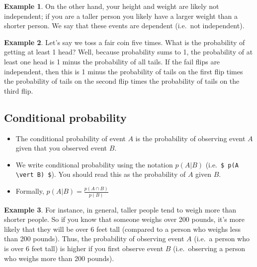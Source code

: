 \documentclass[]{article}
\theoremstyle{definition}
\newtheorem{exmp}{Example}[section]
\begin{document}
\begin{exmp}
On the other hand, your height and weight are likely not independent; if you are a taller person you likely have a larger weight than a shorter person. We say that these events are dependent (i.e.\ not independent).
\end{exmp} 

\begin{exmp}
Let's say we toss a fair coin five times. What is the probability of getting at least 1 head? Well, because probability sums to 1, the probability of at least one head is 1 minus the probability of all tails. If the fail flips are independent, then this is 1 minus the probability of tails on the first flip times the probability of tails on the second flip times the probability of tails on the third flip. 
\end{exmp}

\subsection{Conditional probability}

\begin{itemize}
\item The conditional probability of event $A$ is the probability of observing event $A$ given that you observed event $B$. 

\item We write conditional probability using the notation $p(A|B)$ (i.e.\ \verb|$ p(A \vert B) $|). You should read this as the probability of $A$ given $B$.

\item Formally, $p(A \vert B) = \frac{p(A \cap B)}{p(B)}$
\end{itemize}


\begin{exmp}
For instance, in general, taller people tend to weigh more than shorter people. So if you know that someone weighs over 200 pounds, it's more likely that they will be over 6 feet tall (compared to a person who weighs less than 200 pounds). Thus, the probability of observing event $A$ (i.e.\ a person who is over 6 feet tall) is higher if you first observe event $B$ (i.e.\ observing a person who weighs more than 200 pounds).
\end{exmp}
\end{document}
